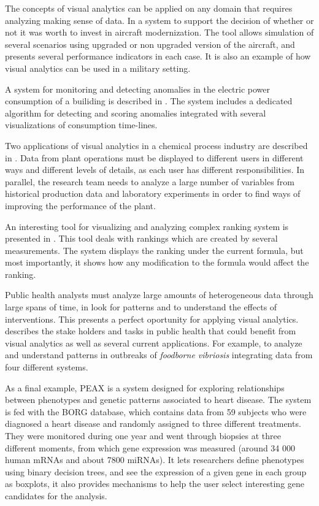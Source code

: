 
The concepts of visual analytics can be applied on any domain that requires analyzing making sense of data. 
In \autocite{soban_visual_2011} a system to support the decision of whether or not it was worth to invest in aircraft modernization. The tool allows simulation of several scenarios using upgraded or non upgraded version of the aircraft, and presents several performance indicators in each case. It is also an example of how visual analytics can be used in a military setting.

A system for monitoring and detecting anomalies in the electric power consumption of a builiding is described in \autocite{janetzko_anomaly_2014}. The system includes a dedicated algorithm for detecting and scoring anomalies integrated with several visualizations of consumption time-lines.

Two applications of visual analytics in a chemical process industry are described in \autocite{stahl_overview_2013}. Data from plant operations must be displayed to different users in different ways and different levels of details, as each user has different responsibilities. In parallel, the research team needs to analyze a large number of variables from historical production data and laboratory experiments in order to find ways of improving the performance of the plant.

An interesting tool for visualizing and analyzing complex ranking system is presented in \autocite{gratzl_lineup:_2013}. This tool deals with rankings which are created by several measurements. The system displays the ranking under the current formula, but most importantly, it shows how any modification to the formula would affect the ranking.

Public health analysts must analyze large amounts of heterogeneous data through large spans of time, in look for patterns and to understand the effects of interventions. This presents a perfect oportunity for applying visual analytics. \autocite{sedig_challenge_2014} describes the stake holders and tasks in public health that could benefit from visual analytics as well as several current applications. For example, to analyze and understand patterns in outbreaks of \emph{foodborne vibriosis} integrating data from four different systems.

As a final example, PEAX \autocite{hinterberg_peax:_2014} is a system designed for exploring relationships between phenotypes and genetic patterns associated to heart disease. The system is fed with the BORG database, which contains data from 59 subjects who were diagnosed a heart disease and randomly assigned to three different treatments. They were monitored during one year and went through biopsies at three different moments, from which gene expression was measured (around 34 000 human mRNAs and about 7800 miRNAs). 
It lets researchers define phenotypes using binary decision trees, and see the expression of a given gene in each group as boxplots, it also provides mechanisms to help the user select interesting gene candidates for the analysis.


